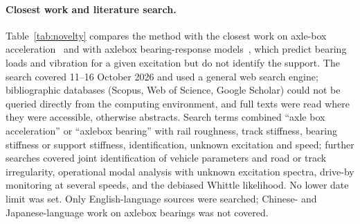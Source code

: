 \paragraph{Closest work and literature search.} Table~\ref{tab:novelty} compares the method with the
closest work on axle-box acceleration~\citep{carrigan2023,shen2023,pieringer2022} and with axlebox
bearing-response models~\citep{li2019axlebox,guan2023}, which predict bearing loads and vibration for
a given excitation but do not identify the support. The search covered 11--16 October 2026 and used a
general web search engine; bibliographic databases (Scopus, Web of Science, Google Scholar) could not be
queried directly from the computing environment, and full texts were read where they were accessible,
otherwise abstracts. Search terms combined ``axle box acceleration'' or ``axlebox bearing'' with rail
roughness, track stiffness, bearing stiffness or support stiffness, identification, unknown excitation and
speed; further searches covered joint identification of vehicle parameters and road or track
irregularity, operational modal analysis with unknown excitation spectra, drive-by monitoring at several
speeds, and the debiased Whittle likelihood. No lower date limit was set. Only English-language sources
were searched; Chinese- and Japanese-language work on axlebox bearings was not covered.

